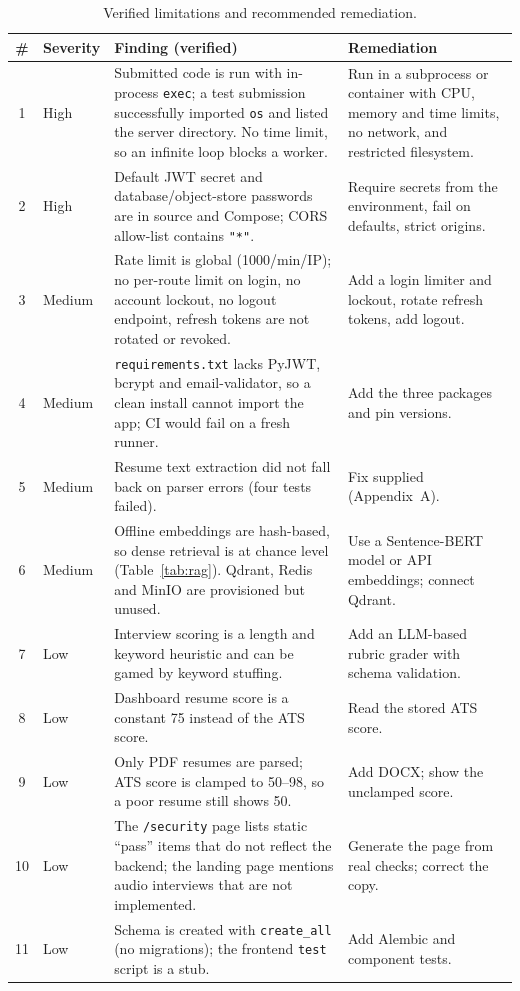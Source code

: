 \documentclass[openany]{tietreport}
\newcommand{\code}[1]{\texttt{\small #1}}
\begin{document}
\begin{table}[h]
\centering\footnotesize
\begin{tabularx}{\textwidth}{@{}c>{\raggedright\arraybackslash}p{0.62in}>{\raggedright\arraybackslash}X>{\raggedright\arraybackslash}X@{}}
\toprule
\textbf{\#} & \textbf{Severity} & \textbf{Finding (verified)} & \textbf{Remediation} \\
\midrule
1 & High & Submitted code is run with in-process \code{exec}; a test submission successfully imported \code{os} and listed the server directory. No time limit, so an infinite loop blocks a worker. & Run in a subprocess or container with CPU, memory and time limits, no network, and restricted filesystem. \\
2 & High & Default JWT secret and database/object-store passwords are in source and Compose; CORS allow-list contains \code{"*"}. & Require secrets from the environment, fail on defaults, strict origins. \\
3 & Medium & Rate limit is global (1000/min/IP); no per-route limit on login, no account lockout, no logout endpoint, refresh tokens are not rotated or revoked. & Add a login limiter and lockout, rotate refresh tokens, add logout. \\
4 & Medium & \code{requirements.txt} lacks PyJWT, bcrypt and email-validator, so a clean install cannot import the app; CI would fail on a fresh runner. & Add the three packages and pin versions. \\
5 & Medium & Resume text extraction did not fall back on parser errors (four tests failed). & Fix supplied (Appendix~A). \\
6 & Medium & Offline embeddings are hash-based, so dense retrieval is at chance level (Table~\ref{tab:rag}). Qdrant, Redis and MinIO are provisioned but unused. & Use a Sentence-BERT model or API embeddings; connect Qdrant. \\
7 & Low & Interview scoring is a length and keyword heuristic and can be gamed by keyword stuffing. & Add an LLM-based rubric grader with schema validation. \\
8 & Low & Dashboard resume score is a constant 75 instead of the ATS score. & Read the stored ATS score. \\
9 & Low & Only PDF resumes are parsed; ATS score is clamped to 50--98, so a poor resume still shows 50. & Add DOCX; show the unclamped score. \\
10 & Low & The \code{/security} page lists static ``pass'' items that do not reflect the backend; the landing page mentions audio interviews that are not implemented. & Generate the page from real checks; correct the copy. \\
11 & Low & Schema is created with \code{create\_all} (no migrations); the frontend \code{test} script is a stub. & Add Alembic and component tests. \\
\bottomrule
\end{tabularx}
\caption{Verified limitations and recommended remediation.}
\label{tab:findings}
\end{table}
\end{document}

